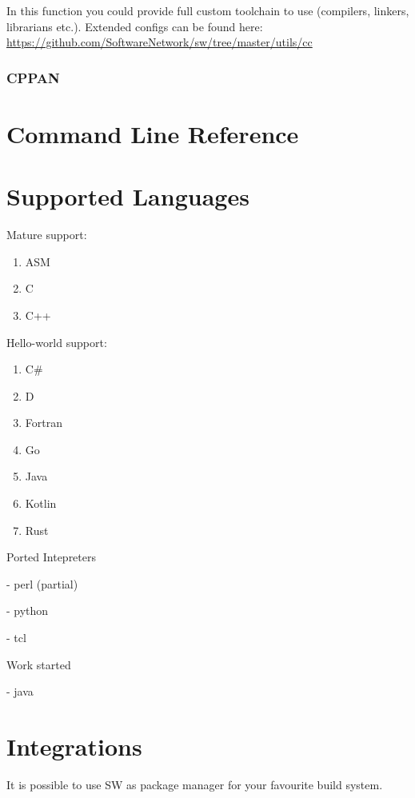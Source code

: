 In this function you could provide full custom toolchain to use (compilers, linkers, librarians etc.).
Extended configs can be found here: \url{https://github.com/SoftwareNetwork/sw/tree/master/utils/cc}


\subsubsection{CPPAN}








\section{Command Line Reference}




\section{Supported Languages}

Mature support:
\begin{enumerate}
\item ASM
\item C
\item C++
\end{enumerate}

Hello-world support:
\begin{enumerate}
\item C\#
\item D
\item Fortran
\item Go
\item Java
\item Kotlin
\item Rust
\end{enumerate}


Ported Intepreters

- perl (partial)

- python

- tcl

Work started

- java


\section{Integrations}

It is possible to use SW as package manager for your favourite build system.

